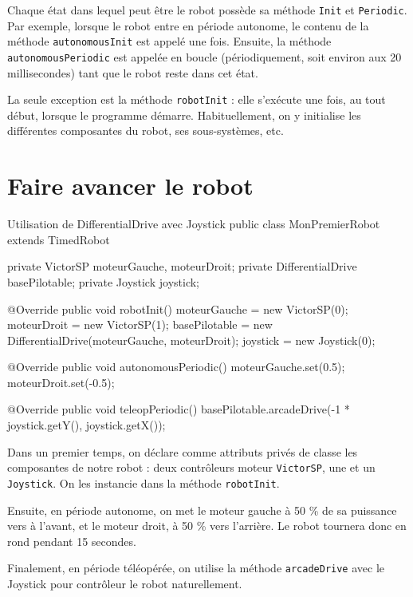 \documentclass[12pt]{report}
\begin{document}
Chaque état dans lequel peut être le robot possède sa méthode \texttt{Init} et \texttt{Periodic}. Par exemple, lorsque le robot entre en période autonome, le contenu de la méthode \texttt{autonomousInit} est appelé une fois. Ensuite, la méthode \texttt{autonomousPeriodic} est appelée en boucle (périodiquement, soit environ aux 20 millisecondes) tant que le robot reste dans cet état.  

La seule exception est la méthode \texttt{robotInit} : elle s'exécute une fois, au tout début, lorsque le programme démarre. Habituellement, on y initialise les différentes composantes du robot, ses sous-systèmes, etc.

\section{Faire avancer le robot}

\begin{MyTCB}{Utilisation de DifferentialDrive avec Joystick}
public class MonPremierRobot extends TimedRobot {
	
	private VictorSP moteurGauche, moteurDroit;
	private DifferentialDrive basePilotable;
	private Joystick joystick;
	
	@Override
	public void robotInit() {
		moteurGauche = new VictorSP(0);
		moteurDroit = new VictorSP(1);
		basePilotable = new DifferentialDrive(moteurGauche, moteurDroit);
		joystick = new Joystick(0);
	}
	
	@Override
	public void autonomousPeriodic() {
		moteurGauche.set(0.5);
		moteurDroit.set(-0.5);
	}
	
	
	@Override
	public void teleopPeriodic() {
		basePilotable.arcadeDrive(-1 * joystick.getY(), joystick.getX());
	}

}

\end{MyTCB}

Dans un premier temps, on déclare comme attributs privés de classe les composantes de notre robot : deux contrôleurs moteur \texttt{VictorSP}, une  et un \texttt{Joystick}. On les instancie dans la méthode \texttt{robotInit}.

Ensuite, en période autonome, on met le moteur gauche à 50 \% de sa puissance vers à l'avant, et le moteur droit, à 50 \% vers l'arrière. Le robot tournera donc en rond pendant 15 secondes.

Finalement, en période téléopérée, on utilise la méthode \texttt{arcadeDrive} avec le Joystick pour contrôleur le robot naturellement. 
\end{document}
